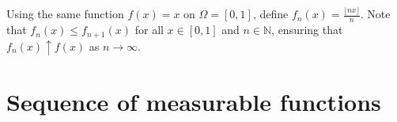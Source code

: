 \begin{myexample}[]
    \label{myex:prop7.12}
Using the same function $f(x) = x$ on $\Omega = [0,1]$, define $f_n(x) = \frac{\lfloor nx \rfloor}{n}$. Note that $f_n(x) \leq f_{n+1}(x)$ for all $x \in [0,1]$ and $n \in \mathbb{N}$, ensuring that $f_n(x) \uparrow f(x)$ as $n \rightarrow \infty$.
\end{myexample}

\section{Sequence of measurable functions}%
\label{sec:Sequence of measurable functions}
